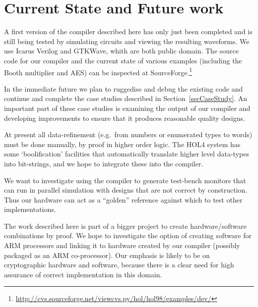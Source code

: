 \documentclass{llncs}
\begin{document}
\section{Current State and Future work}
\label{secFutureWork}


A first version of the compiler described here has only just been
completed and is still being tested by simulating circuits and
viewing the resulting waveforms. We use Icarus Verilog and GTKWave,
whith are both public domain.  The source code for our compiler and
the current state of various examples (including the Booth multiplier
and AES) can be inspected at
SourceForge.\footnote{\url{http://cvs.sourceforge.net/viewcvs.py/hol/hol98/examples/dev/}}


In the immediate future we plan to ruggedise and debug the existing
code and continue and complete the case studies described in
Section~\ref{secCaseStudy}. An important part of these case studies is
examining the output of our compiler and developing improvements to
ensure that it produces reasonable quality designs.

At present all data-refinement (e.g.~from numbers or enumerated types
to words) must be done manually, by proof in higher order logic. The
HOL4 system has some `boolification' facilities that automatically
translate higher level data-types into bit-strings, and we hope to
integrate these into the compiler.

We want to investigate using the compiler to generate test-bench
monitors that can run in parallel simulation with designs that are not
correct by construction.  Thus our hardware can act as a ``golden''
reference against which to test other implementations.

The work described here is part of a bigger project to create
hardware/software combinations by proof.  We hope to investigate the
option of creating software for ARM processors and linking it to
    hardware created by our compiler (possibly packaged as an ARM
co-processor). Our emphasis is likely to be on cryptographic hardware
and software, because there is a clear need for high assurance of
correct implementation in this domain.






\end{document}

